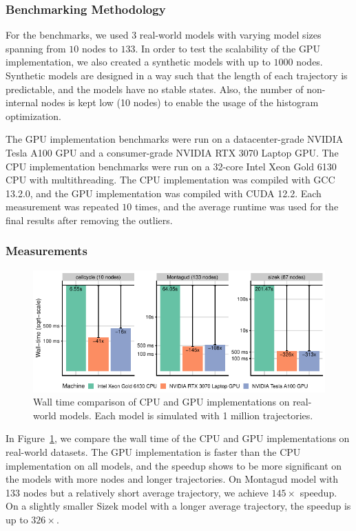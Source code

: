 \documentclass[times, twoside]{zHenriquesLab-StyleBioRxiv}
\begin{document}
\subsubsection*{Benchmarking Methodology}

For the benchmarks, we used $3$ real-world models with varying model sizes spanning from $10$ nodes to $133$. In order to test the scalability of the GPU implementation, we also created a synthetic models with up to $1000$ nodes. Synthetic models are designed in a way such that the length of each trajectory is predictable, and the models have no stable states. Also, the number of non-internal nodes is kept low (10 nodes) to enable the usage of the histogram optimization.

The GPU implementation benchmarks were run on a datacenter-grade NVIDIA Tesla A100 GPU and a consumer-grade NVIDIA RTX 3070 Laptop GPU. The CPU implementation benchmarks were run on a 32-core Intel Xeon Gold 6130 CPU with multithreading. The CPU implementation was compiled with GCC 13.2.0, and the GPU implementation was compiled with CUDA 12.2. Each measurement was repeated $10$ times, and the average runtime was used for the final results after removing the outliers.

\subsubsection*{Measurements}

\begin{figure}
    \centering
    \includegraphics[width=\linewidth]{Figures/real.pdf}
    \caption{Wall time comparison of CPU and GPU implementations on real-world models. Each model is simulated with 1 million trajectories.}
    \label{fig:real}
\end{figure}

In Figure~\ref{fig:real}, we compare the wall time of the CPU and GPU implementations on real-world datasets. The GPU implementation is faster than the CPU implementation on all models, and the speedup shows to be more significant on the models with more nodes and longer trajectories. On Montagud model with 133 nodes but a relatively short average trajectory, we achieve $145\times$ speedup. On a slightly smaller Sizek model with a longer average trajectory, the speedup is up to $326\times$. 
\end{document}
